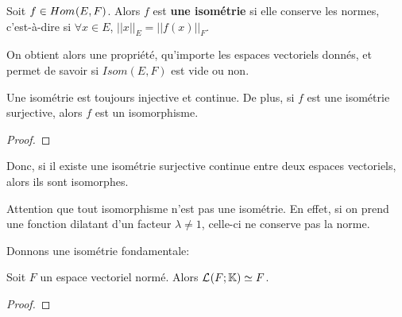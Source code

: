 \begin{definition}
\label{definition:isometrie}
	Soit $f \in Hom_{}(E, F)$.
	Alors $f$ est \textbf{une isométrie} si elle conserve les normes, c'est-à-dire si
	$\forall x \in E$, $||x||_{E} =  ||f(x)||_{F}$.
\end{definition}

On obtient alors une propriété, qu'importe les espaces vectoriels donnés, et
permet de savoir si $Isom(E, F)$ est vide ou non.

\begin{proposition}
	Une isométrie est toujours injective et continue. De plus, si $f$ est une
	isométrie surjective, alors $f$ est un isomorphisme.
\end{proposition}

\ifdefined\outputproof
\begin{proof}

\end{proof}
\fi

Donc, si il existe une isométrie surjective continue entre deux espaces
vectoriels, alors ils sont isomorphes.

Attention que tout isomorphisme n'est pas une isométrie. En effet, si on prend
une fonction dilatant d'un facteur $\lambda \neq 1$, celle-ci ne conserve pas la
norme.

Donnons une isométrie fondamentale:

\begin{proposition}
	Soit $F$ un espace vectoriel normé. Alors $\mathcal{L}_{}(F; \mathbb{K})
	\simeq F$.
\end{proposition}

\ifdefined\outproof
\begin{proof}

\end{proof}
\fi
